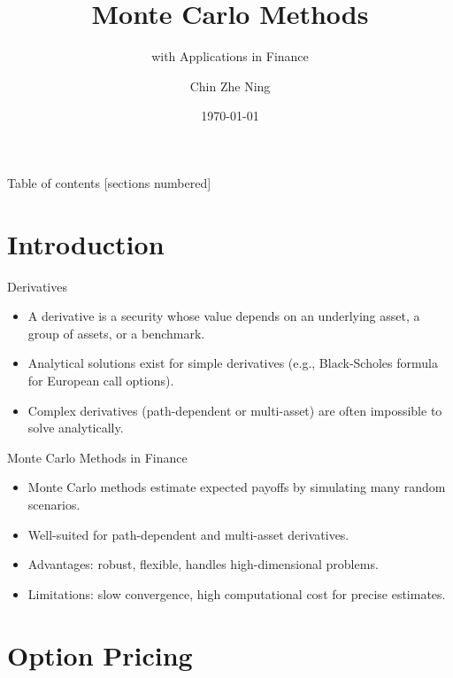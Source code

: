 \documentclass[9pt]{beamer}
\title{Monte Carlo Methods }
\subtitle{with Applications in Finance}
\date{\today}
\author{Chin Zhe Ning\inst{1}}
\institute{
\inst{1} National University of Singapore \\ Prof. Ren Weiqing
}
\begin{document}
\maketitle

\begin{frame}{Table of contents}
  [sections numbered]
  \tableofcontents%
\end{frame}

\section[Introduction]{Introduction}
\begin{frame}{Derivatives}
\begin{itemize}
    \item A derivative is a security whose value depends on an underlying asset, a group of assets, or a benchmark.
    \item Analytical solutions exist for simple derivatives (e.g., Black-Scholes formula for European call options).
    \item Complex derivatives (path-dependent or multi-asset) are often impossible to solve analytically.
\end{itemize}
\end{frame}

\begin{frame}{Monte Carlo Methods in Finance}
\begin{itemize}
    \item Monte Carlo methods estimate expected payoffs by simulating many random scenarios.
    \item Well-suited for path-dependent and multi-asset derivatives.
    \item Advantages: robust, flexible, handles high-dimensional problems.
    \item Limitations: slow convergence, high computational cost for precise estimates.
\end{itemize}
\end{frame}

\section[Option Pricing]{Option Pricing}
\end{document}

